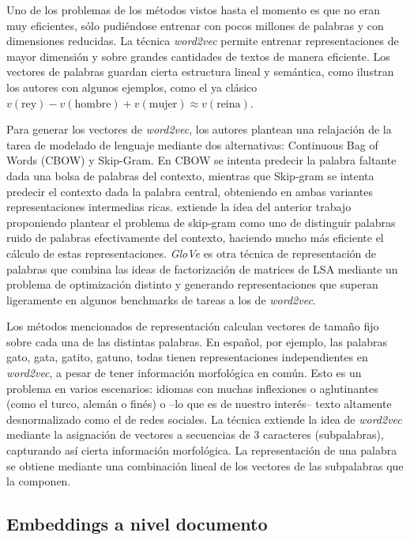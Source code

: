 Uno de los problemas de los métodos vistos hasta el momento es que no eran muy eficientes, sólo pudiéndose entrenar con pocos millones de palabras y con dimensiones reducidas. La técnica \emph{word2vec} \cite{mikolov2013efficient} permite entrenar representaciones de mayor dimensión y sobre grandes cantidades de textos de manera eficiente. Los vectores de palabras guardan cierta estructura lineal y semántica, como ilustran los autores con algunos ejemplos, como el ya clásico $v(\text{rey}) - v(\text{hombre}) + v(\text{mujer}) \approx v(\text{reina})$.

Para generar los vectores de \emph{word2vec}, los autores plantean una relajación de la tarea de modelado de lenguaje mediante dos alternativas: Continuous Bag of Words (CBOW) y Skip-Gram. En CBOW se intenta predecir la palabra faltante dada una bolsa de palabras del contexto, mientras que Skip-gram se intenta predecir el contexto dada la palabra central, obteniendo en ambas variantes representaciones intermedias ricas. \citet{mikolov2013efficient} extiende la idea del anterior trabajo proponiendo plantear el problema de skip-gram como uno de distinguir palabras ruido de palabras efectivamente del contexto, haciendo mucho más eficiente el cálculo de estas representaciones. \emph{GloVe} \cite{pennington2014glove} es otra técnica de representación de palabras que combina las ideas de factorización de matrices de LSA  mediante un problema de optimización distinto y generando representaciones que superan ligeramente en algunos benchmarks de tareas a los de \emph{word2vec}.

Los métodos mencionados de representación calculan vectores de tamaño fijo sobre cada una de las distintas palabras. En español, por ejemplo, las palabras gato, gata, gatito, gatuno, todas tienen representaciones independientes en \emph{word2vec}, a pesar de tener información morfológica en común. Esto es un problema en varios escenarios: idiomas con muchas inflexiones o aglutinantes (como el turco, alemán o finés) o --lo que es de nuestro interés-- texto altamente desnormalizado como el de redes sociales. La técnica \fasttext{} \cite{bojanowski16} extiende la idea de \emph{word2vec} mediante la asignación de vectores a secuencias de 3 caracteres (subpalabras), capturando así cierta información morfológica. La representación de una palabra se obtiene mediante una combinación lineal de los vectores de las subpalabras que la componen.

\subsection{Embeddings a nivel documento}
\label{sec:02_tweet_embeddings}

